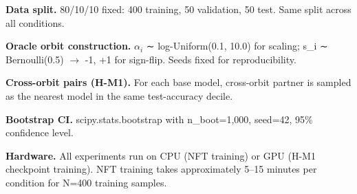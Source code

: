 \textbf{Data split.} 80/10/10 fixed: 400 training, 50 validation, 50 test. Same split across all conditions.

\textbf{Oracle orbit construction.} $\alpha _i$ ∼ log-Uniform(0.1, 10.0) for scaling; s\_i ∼ Bernoulli(0.5) $\rightarrow$ {-1, +1} for sign-flip. Seeds fixed for reproducibility.

\textbf{Cross-orbit pairs (H-M1).} For each base model, cross-orbit partner is sampled as the nearest model in the same test-accuracy decile.

\textbf{Bootstrap CI.} scipy.stats.bootstrap with n\_boot=1,000, seed=42, 95\% confidence level.

\textbf{Hardware.} All experiments run on CPU (NFT training) or GPU (H-M1 checkpoint training). NFT training takes approximately 5--15 minutes per condition for N=400 training samples.

